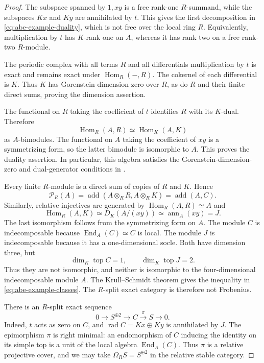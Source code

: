\documentclass[12pt,a4paper,english,reqno]{amsart}
\numberwithin{equation}{section}
\theoremstyle{plain}
\theoremstyle{definition}
\begin{document}
\begin{proof}
The subspace spanned by $1,xy$ is a free rank-one $R$-summand,
while the subspaces $Kx$ and $Ky$ are annihilated by $t$.
This gives the first decomposition in
\eqref{eq:abe-example-duality}, which is not free over the
local ring $R$.  Equivalently, multiplication by $t$ has
$K$-rank one on $A$, whereas it has rank two on a free
rank-two $R$-module.

The periodic complex with all terms $R$ and all differentials
multiplication by $t$ is exact and remains exact under
$\operatorname{Hom}_R(-,R)$.  The cokernel of each differential is $K$.
Thus $K$ has Gorenstein dimension zero over $R$, as do $R$ and
their finite direct sums, proving the dimension assertion.

The functional on $R$ taking the coefficient of $t$ identifies
$R$ with its $K$-dual.  Therefore
\[
 \operatorname{Hom}_R(A,R)\simeq\operatorname{Hom}_K(A,K)
\]
as $A$-bimodules.  The functional on $A$ taking the coefficient
of $xy$ is a symmetrizing form, so the latter bimodule is
isomorphic to $A$.  This proves the duality assertion.  In particular, this algebra satisfies the Gorenstein-dimension-zero
and dual-generator conditions in \cite[Definition~3.1]{AbeHoshino2007}.

Every finite $R$-module is a direct sum of copies of $R$ and
$K$.  Hence
\[
 \mathcal P_R(A)
  =\operatorname{add}(A\otimes_RR,A\otimes_RK)
  =\operatorname{add}(A,C).
\]
Similarly, relative injectives are generated by
$\operatorname{Hom}_R(A,R)\simeq A$ and
\[
 \operatorname{Hom}_R(A,K)
      \simeq D_K(A/(xy))\simeq\operatorname{ann}_A(xy)=J.
\]
The last isomorphism follows from the symmetrizing form on $A$.
The module $C$ is indecomposable because
$\operatorname{End}_A(C)\simeq C$ is local.  The module $J$
is indecomposable because it has a one-dimensional socle.
Both have dimension three, but
\[
 \dim_K\operatorname{top}C=1,
 \qquad \dim_K\operatorname{top}J=2.
\]
Thus they are not isomorphic, and neither is isomorphic to
the four-dimensional indecomposable module $A$.
The Krull--Schmidt theorem gives the inequality in
\eqref{eq:abe-example-classes}.  The $R$-split exact category
is therefore not Frobenius.

There is an $R$-split exact sequence
\begin{equation}
 0\longrightarrow S^{\oplus2}\longrightarrow C
       \xrightarrow{\pi} S\longrightarrow0.
 \label{eq:abe-example-relative-cover}
\end{equation}
Indeed, $t$ acts as zero on $C$, and
$\operatorname{rad}C=Kx\oplus Ky$ is annihilated by $J$.
The epimorphism $\pi$ is right minimal: an endomorphism of
$C$ inducing the identity on its simple top is a unit of the
local algebra $\operatorname{End}_A(C)$.  Thus $\pi$ is a relative projective cover, and we may take
$\Omega_R S=S^{\oplus2}$ in the relative stable category.


\end{proof}
\end{document}
